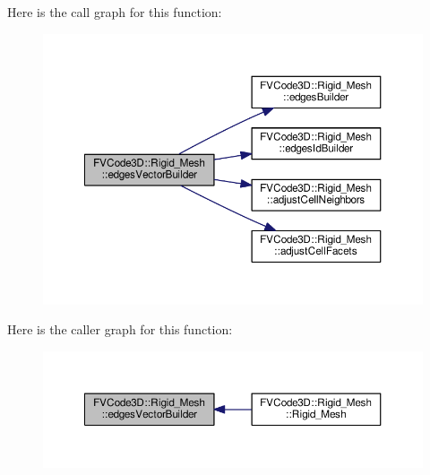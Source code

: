 Here is the call graph for this function\+:
\nopagebreak
\begin{figure}[H]
\begin{center}
\leavevmode
\includegraphics[width=350pt]{classFVCode3D_1_1Rigid__Mesh_ac06b1206bf25e6045a2b361b5e7508f4_cgraph}
\end{center}
\end{figure}




Here is the caller graph for this function\+:
\nopagebreak
\begin{figure}[H]
\begin{center}
\leavevmode
\includegraphics[width=350pt]{classFVCode3D_1_1Rigid__Mesh_ac06b1206bf25e6045a2b361b5e7508f4_icgraph}
\end{center}
\end{figure}


